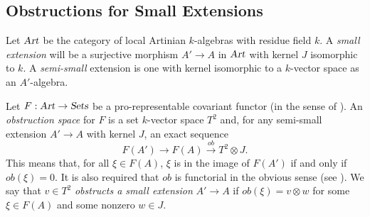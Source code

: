 \documentclass[11pt]{article}
\theoremstyle{plain}
\newtheorem{lem}[prop]{Lemma}
\theoremstyle{definition}
\newenvironment{pf}{\begin{proof}}{\end{proof}}
\newcommand{\noprint}[1]{}
\newcommand{\com}{^{\scriptscriptstyle\bullet}}
\newcommand{\DD}{{\mathfrak{D}}}
\newcommand{\NN}{{\mathfrak{N}}}
\newcommand{\CC}{{\mathfrak{C}}}
\newcommand{\iI}{{\mathcal{I}}}
\newcommand{\ob}{\mathop{\rm ob}}
\newcommand{\spec}{\mathop{\rm Spec}\nolimits}
\newcommand{\Spec}{\spec}
\newcommand{\ol}{\overline}
\providecommand{\Spec}{\operatorname{Spec}}
\theoremstyle{plain}
\theoremstyle{definition}
\theoremstyle{remark}
\begin{document}
\noprint{
A square-zero extension will be called {\em curvilinear }if it is isomorphic
to \(\Spec K[t]/t^r\to \Spec K[t]/t^{r+s}\), with \(K\) a field.
\begin{lem} Let \(T\to \ol T\) be a curvilinear extension, \(g:T\to X\) a
morphism. Then \(\ob(g)\) factors via \(\CC_X\). Conversely, if \(\DD\) is a closed
subcone stack of \(\NN_X\) such that for every curvilinear extension \(T\to
\ol T\) and every morphism \(g:T\to X\) the morphism \(ob(g)\) factors via \(\DD\),
then \(\DD\) contains \(\CC_X\).
\end{lem}
\begin{pf} The first statement is local, so assume that \(X\) is an affine
scheme embedded as closed subscheme in a smooth scheme \(W\), with ideal sheaf
\(\iI\). Let \(\hat T=\Spec K[[t]]\); extend \(g\) to a morphism
\(\hat g:\hat T\to W\). (I am not ready with it yet).
\end{pf}

}



\newcommand{\Sets}{\hbox{\sl Sets}}
\newcommand{\Art}{\hbox{\sl Art}}
\newcommand{\ann}{\hbox{\sl ann}\,}
\newcommand{\nbx}{h^1/h^0(T_X\com)}
\newcommand{\nor}{\ol{ N}_p}
\newcommand{\cp}{\ol{ C}_p}

\subsection{Obstructions for Small Extensions}

Let \(\Art\) be the category of local Artinian \(k\)-algebras with residue
field \(k\). A {\sl small extension} will be a surjective morphism \(A'\to A\) in
\(\Art\) with kernel \(J\) isomorphic to \(k\). A {\sl semi-small} extension is one
with
kernel isomorphic to a \(k\)-vector space as an \(A'\)-algebra.

Let \(F:\Art \to \Sets\) be a pro-representable covariant functor (in the
sense of \cite{schlessinger}). An {\em obstruction space} for \(F\) is a
set \(k\)-vector space \(T^2\) and, for any semi-small extension \(A'\to A\)
with kernel \(J\), an exact sequence
\[
F(A')\longrightarrow
F(A)\stackrel{ob}{\longrightarrow} T^2\otimes J.
\]
This means that,
for all \(\xi\in F(A)\), \(\xi\) is in the image of \(F(A')\) if and only if
\(ob(\xi)=0\). It is also required that \(ob\) is functorial in the
obvious sense (see \cite{kawamata}). We say that \(v\in T^2\) {\em
obstructs a small extension }\(A'\to A\) if \(ob(\xi)=v\otimes w\) for
some \(\xi\in F(A)\) and some nonzero \(w\in J\).
\end{document}
